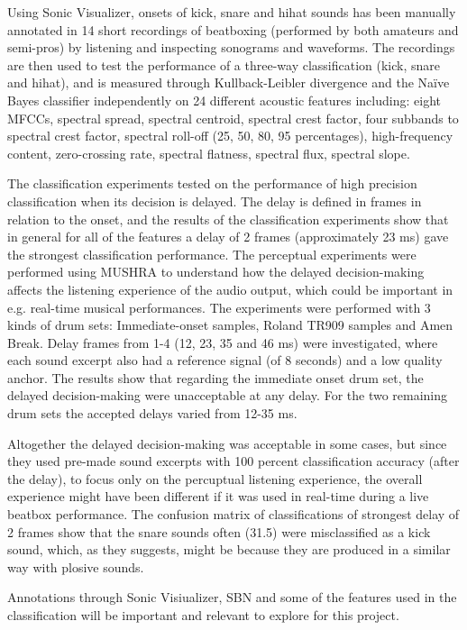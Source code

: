 Using Sonic Visualizer, onsets of kick, snare and hihat sounds has been manually annotated in 14 short recordings of beatboxing (performed by both amateurs and semi-pros) by listening and inspecting sonograms and waveforms. The recordings are then used to test the performance of a three-way classification (kick, snare and hihat), and is measured through Kullback-Leibler divergence and the Naïve Bayes classifier independently on 24 different acoustic features including: eight MFCCs, spectral spread, spectral centroid, spectral crest factor, four subbands to spectral crest factor, spectral roll-off (25, 50, 80, 95 percentages), high-frequency content, zero-crossing rate, spectral flatness, spectral flux, spectral slope.

The classification experiments tested on the performance of high precision classification when its decision is delayed.
The delay is defined in frames in relation to the onset, and the results of the classification experiments show that in general for all of the features a delay of 2 frames (approximately 23 ms) gave the strongest classification performance.
The perceptual experiments were performed using MUSHRA to understand how the delayed decision-making affects the listening experience of the audio output, which could be important in e.g. real-time musical performances. The experiments were performed with 3 kinds of drum sets: Immediate-onset samples, Roland TR909 samples and Amen Break. Delay frames from 1-4 (12, 23, 35 and 46 ms) were investigated, where each sound excerpt also had a reference signal (of 8 seconds) and a low quality anchor. The results show that regarding the immediate onset drum set, the delayed decision-making were unacceptable at any delay. For the two remaining drum sets the accepted delays varied from 12-35 ms.

Altogether the delayed decision-making was acceptable in some cases, but since they used pre-made sound excerpts with 100 percent classification accuracy (after the delay), to focus only on the percuptual listening experience, the overall experience might have been different if it was used in real-time during a live beatbox performance. 
The confusion matrix of classifications of strongest delay of 2 frames show that the snare sounds often (31.5) were misclassified as a kick sound, which, as they suggests, might be because they are produced in a similar way with plosive sounds.

Annotations through Sonic Visiualizer, SBN and some of the features used in the classification will be important and relevant to explore for this project.

